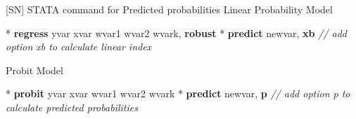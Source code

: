 \documentclass[
  10pt,
  ignorenonframetext,
]{beamer}
\newenvironment{Shaded}{\begin{snugshade}}{\end{snugshade}}
\newcommand{\CommentTok}[1]{\textcolor[rgb]{0.56,0.35,0.01}{\textit{#1}}}
\newcommand{\KeywordTok}[1]{\textcolor[rgb]{0.13,0.29,0.53}{\textbf{#1}}}
\newcommand{\NormalTok}[1]{#1}
\begin{document}
\begin{frame}[fragile]{{[}SN{]} STATA command for Predicted
probabilities}
\protect\hypertarget{sn-stata-command-for-predicted-probabilities}{}
\normalsize Linear Probability Model \small

\begin{Shaded}
\begin{Highlighting}[]
\NormalTok{* }\KeywordTok{regress}\NormalTok{ yvar xvar wvar1 wvar2 wvark, }\KeywordTok{robust}
\NormalTok{* }\KeywordTok{predict}\NormalTok{ newvar, }\KeywordTok{xb}
\CommentTok{// add option \textquotesingle{}xb\textquotesingle{} to calculate linear index}
\end{Highlighting}
\end{Shaded}

\normalsize Probit Model \small

\begin{Shaded}
\begin{Highlighting}[]
\NormalTok{* }\KeywordTok{probit}\NormalTok{ yvar xvar wvar1 wvar2 wvark}
\NormalTok{* }\KeywordTok{predict}\NormalTok{ newvar, }\KeywordTok{p}
\CommentTok{// add option \textquotesingle{}p\textquotesingle{} to calculate predicted probabilities}
\end{Highlighting}
\end{Shaded}
\end{frame}
\end{document}
